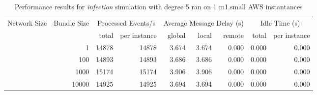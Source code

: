 \begin{table}
	  \caption[Performance results, \emph{infection:5 on 1 m1.small instances }]{ Performance results for \emph{ infection } simulation with degree 5 ran on 1 m1.small AWS instantances }
	\begin{tabular}{rrrrrrrrr}
	\hline\noalign{\smallskip}

	Network Size &
	Bundle Size &
	\multicolumn{2}{c}{Processed Events/s} & 
	\multicolumn{3}{c}{Average Message Delay (s)} & 
	\multicolumn{2}{c}{Idle Time (s)}  \\

	 & 
	 & 
	 total & per instance
     & global & local & remote
     & total & per instance\\

			
				\noalign{\smallskip}\hline
				\multirow{ 4 }{*}{ 40000 } &
				
					
					 
					\multirow{ 1 }{*}{ 1 } &
					
						
							    
							     14878  & 14878  
	                           & 3.674 & 3.674 & 0.000
	                           & 0.000 & 0.000  \\
	                
	            
					 &  
					 
					\multirow{ 1 }{*}{ 100 } &
					
						
							    
							     14893  & 14893  
	                           & 3.686 & 3.686 & 0.000
	                           & 0.000 & 0.000  \\
	                
	            
					 &  
					 
					\multirow{ 1 }{*}{ 1000 } &
					
						
							    
							     15174  & 15174  
	                           & 3.906 & 3.906 & 0.000
	                           & 0.000 & 0.000  \\
	                
	            
					 &  
					 
					\multirow{ 1 }{*}{ 10000 } &
					
						
							    
							     14925  & 14925  
	                           & 3.694 & 3.694 & 0.000
	                           & 0.000 & 0.000  \\
	                

\end{tabular}
\end{table}
